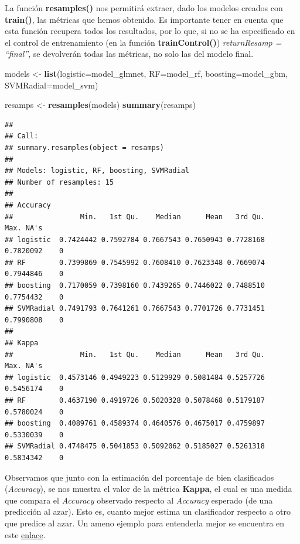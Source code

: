 \documentclass[]{article}
\newenvironment{Shaded}{\begin{snugshade}}{\end{snugshade}}
\newcommand{\DataTypeTok}[1]{\textcolor[rgb]{0.13,0.29,0.53}{#1}}
\newcommand{\KeywordTok}[1]{\textcolor[rgb]{0.13,0.29,0.53}{\textbf{#1}}}
\newcommand{\NormalTok}[1]{#1}
\newcommand{\StringTok}[1]{\textcolor[rgb]{0.31,0.60,0.02}{#1}}
\begin{document}
La función \textbf{resamples()} nos permitirá extraer, dado los modelos creados
con \textbf{train()}, las métricas que hemos obtenido. Es importante tener en cuenta que esta función
recupera todos los resultados, por lo que, si no se ha especificado en el
control de entrenamiento (en la función \textbf{trainControl()}) \emph{returnResamp = ``final''}, se devolverán
todas las métricas, no solo las del modelo final.

\begin{Shaded}
\begin{Highlighting}[]
\NormalTok{models <-}\StringTok{ }\KeywordTok{list}\NormalTok{(}\DataTypeTok{logistic=}\NormalTok{model_glmnet,}
               \DataTypeTok{RF=}\NormalTok{model_rf, }
               \DataTypeTok{boosting=}\NormalTok{model_gbm, }
               \DataTypeTok{SVMRadial=}\NormalTok{model_svm)}

\NormalTok{resamps <-}\StringTok{ }\KeywordTok{resamples}\NormalTok{(models)}
\KeywordTok{summary}\NormalTok{(resamps)}
\end{Highlighting}
\end{Shaded}

\begin{verbatim}
## 
## Call:
## summary.resamples(object = resamps)
## 
## Models: logistic, RF, boosting, SVMRadial 
## Number of resamples: 15 
## 
## Accuracy 
##                Min.   1st Qu.    Median      Mean   3rd Qu.      Max. NA's
## logistic  0.7424442 0.7592784 0.7667543 0.7650943 0.7728168 0.7820092    0
## RF        0.7399869 0.7545992 0.7608410 0.7623348 0.7669074 0.7944846    0
## boosting  0.7170059 0.7398160 0.7439265 0.7446022 0.7488510 0.7754432    0
## SVMRadial 0.7491793 0.7641261 0.7667543 0.7701726 0.7731451 0.7990808    0
## 
## Kappa 
##                Min.   1st Qu.    Median      Mean   3rd Qu.      Max. NA's
## logistic  0.4573146 0.4949223 0.5129929 0.5081484 0.5257726 0.5456174    0
## RF        0.4637190 0.4919726 0.5020328 0.5078468 0.5179187 0.5780024    0
## boosting  0.4089761 0.4589374 0.4640576 0.4675017 0.4759897 0.5330039    0
## SVMRadial 0.4748475 0.5041853 0.5092062 0.5185027 0.5261318 0.5834342    0
\end{verbatim}

Observamos que junto con la estimación del porcentaje de bien
clasificados (\emph{Accuracy}), se nos muestra el valor de la métrica
\textbf{Kappa}, el cual es una medida que compara el \emph{Accuracy}
observado respecto al \emph{Accuracy} esperado (de una predicción al
azar). Esto es, cuanto mejor estima un clasificador respecto a otro que
predice al azar. Un ameno ejemplo para entenderla mejor se encuentra en
este
\href{https://stats.stackexchange.com/questions/82162/cohens-kappa-in-plain-english}{\color{blue}enlace}.
\end{document}
